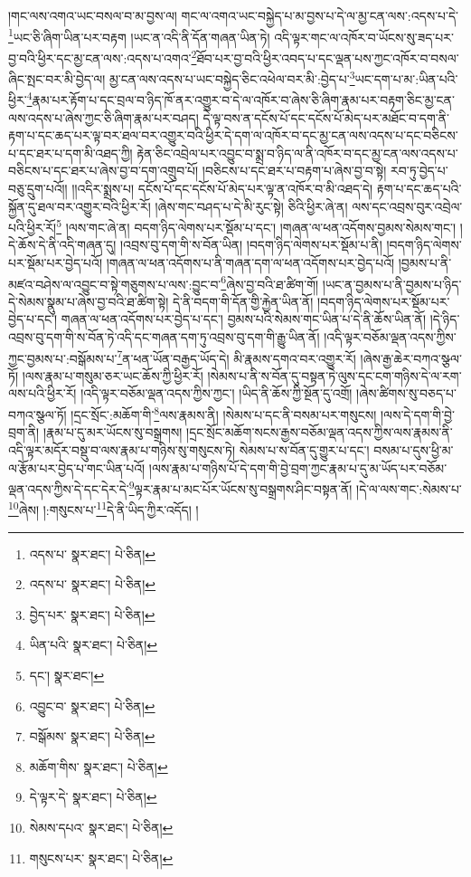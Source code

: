 །གང་ལས་འགའ་ཡང་བསལ་བ་མ་བྱས་ལ། གང་ལ་འགའ་ཡང་བསྐྱེད་པ་མ་བྱས་པ་དེ་ལ་མྱ་ངན་ལས་:འདས་པ་དེ་\footnote{འདས་པ་  སྣར་ཐང་།  པེ་ཅིན། }ཡང་ཅི་ཞིག་ཡིན་པར་བརྟག །ཡང་ན་འདི་ནི་དོན་གཞན་ཡིན་ཏེ། འདི་ལྟར་གང་ལ་འཁོར་བ་ཡོངས་སུ་ཟད་པར་བྱ་བའི་ཕྱིར་དང་མྱ་ངན་ལས་:འདས་པ་འགའ་\footnote{འདས་པ་  སྣར་ཐང་།  པེ་ཅིན། }ཐོབ་པར་བྱ་བའི་ཕྱིར་འབད་པ་དང་ལྡན་པས་ཀྱང་འཁོར་བ་བསལ་ཞིང་སྤང་བར་མི་བྱེད་ལ། མྱ་ངན་ལས་འདས་པ་ཡང་བསྐྱེད་ཅིང་འཕེལ་བར་མི་:བྱེད་པ་\footnote{བྱེད་པར་  སྣར་ཐང་།  པེ་ཅིན། }ཡང་དག་པ་མ་:ཡིན་པའི་ཕྱིར་\footnote{ཡིན་པའི་  སྣར་ཐང་།  པེ་ཅིན། }རྣམ་པར་རྟོག་པ་དང་བྲལ་བ་ཉིད་ཁོ་ནར་འགྱུར་བ་དེ་ལ་འཁོར་བ་ཞེས་ཅི་ཞིག་རྣམ་པར་བརྟག་ཅིང་མྱ་ངན་ལས་འདས་པ་ཞེས་ཀྱང་ཅི་ཞིག་རྣམ་པར་བཤད། དེ་ལྟ་བས་ན་དངོས་པོ་དང་དངོས་པོ་མེད་པར་མཐོང་བ་དག་ནི་རྟག་པ་དང་ཆད་པར་ལྟ་བར་ཐལ་བར་འགྱུར་བའི་ཕྱིར་དེ་དག་ལ་འཁོར་བ་དང་མྱ་ངན་ལས་འདས་པ་དང་བཅིངས་པ་དང་ཐར་པ་དག་མི་འཐད་ཀྱི། རྟེན་ཅིང་འབྲེལ་པར་འབྱུང་བ་སྨྲ་བ་ཉིད་ལ་ནི་འཁོར་བ་དང་མྱ་ངན་ལས་འདས་པ་བཅིངས་པ་དང་ཐར་པ་ཞེས་བྱ་བ་དག་འགྲུབ་པོ། །བཅིངས་པ་དང་ཐར་པ་བརྟག་པ་ཞེས་བྱ་བ་སྟེ། རབ་ཏུ་བྱེད་པ་བཅུ་དྲུག་པའོ།། །།འདིར་སྨྲས་པ། དངོས་པོ་དང་དངོས་པོ་མེད་པར་ལྟ་ན་འཁོར་བ་མི་འཐད་དེ། རྟག་པ་དང་ཆད་པའི་སྐྱོན་དུ་ཐལ་བར་འགྱུར་བའི་ཕྱིར་རོ། །ཞེས་གང་བཤད་པ་དེ་མི་རུང་སྟེ། ཅིའི་ཕྱིར་ཞེ་ན། ལས་དང་འབྲས་བུར་འབྲེལ་པའི་ཕྱིར་རོ།\footnote{དང་།  སྣར་ཐང་། } །ལས་གང་ཞེ་ན། བདག་ཉིད་ལེགས་པར་སྡོམ་པ་དང་། །གཞན་ལ་ཕན་འདོགས་བྱམས་སེམས་གང་། །དེ་ཆོས་དེ་ནི་འདི་གཞན་དུ། །འབྲས་བུ་དག་གི་ས་བོན་ཡིན། །བདག་ཉིད་ལེགས་པར་སྡོམ་པ་ནི། །བདག་ཉིད་ལེགས་པར་སྡོམ་པར་བྱེད་པའོ། །གཞན་ལ་ཕན་འདོགས་པ་ནི་གཞན་དག་ལ་ཕན་འདོགས་པར་བྱེད་པའོ། །བྱམས་པ་ནི་མཛའ་བཤེས་ལ་འབྱུང་བ་སྟེ་གཅུགས་པ་ལས་:བྱུང་བ་\footnote{འབྱུང་བ་  སྣར་ཐང་།  པེ་ཅིན། }ཞེས་བྱ་བའི་ཐ་ཚིག་གོ། །ཡང་ན་བྱམས་པ་ནི་བྱམས་པ་ཉིད་དེ་སེམས་སྣུམ་པ་ཞེས་བྱ་བའི་ཐ་ཚིག་སྟེ། དེ་ནི་བདག་གི་དོན་གྱི་རྐྱེན་ཡིན་ནོ། །བདག་ཉིད་ལེགས་པར་སྡོམ་པར་བྱེད་པ་དང་། གཞན་ལ་ཕན་འདོགས་པར་བྱེད་པ་དང་། བྱམས་པའི་སེམས་གང་ཡིན་པ་དེ་ནི་ཆོས་ཡིན་ནོ། །དེ་ཉིད་འབྲས་བུ་དག་གི་ས་བོན་ཏེ་འདི་དང་གཞན་དག་ཏུ་འབྲས་བུ་དག་གི་རྒྱུ་ཡིན་ནོ། །འདི་ལྟར་བཅོམ་ལྡན་འདས་ཀྱིས་ཀྱང་བྱམས་པ་:བསྒོམས་པ་\footnote{བསྒོམས་  སྣར་ཐང་།  པེ་ཅིན། }ན་ཕན་ཡོན་བརྒྱད་ཡོད་དེ། མི་རྣམས་དགའ་བར་འགྱུར་རོ། །ཞེས་རྒྱ་ཆེར་བཀའ་སྩལ་ཏོ། །ལས་རྣམ་པ་གསུམ་ཅར་ཡང་ཆོས་ཀྱི་ཕྱིར་རོ། །སེམས་པ་ནི་ས་བོན་དུ་བསྟན་ཏེ་ལུས་དང་ངག་གཉིས་དེ་ལ་རག་ལས་པའི་ཕྱིར་རོ། །འདི་ལྟར་བཅོམ་ལྡན་འདས་ཀྱིས་ཀྱང་། །ཡིད་ནི་ཆོས་ཀྱི་སྔོན་དུ་འགྲོ། །ཞེས་ཚིགས་སུ་བཅད་པ་བཀའ་སྩལ་ཏོ། །དྲང་སྲོང་:མཆོག་གི་\footnote{མཆོག་གིས་  སྣར་ཐང་།  པེ་ཅིན། }ལས་རྣམས་ནི། །སེམས་པ་དང་ནི་བསམ་པར་གསུངས། །ལས་དེ་དག་གི་བྱེ་བྲག་ནི། །རྣམ་པ་དུ་མར་ཡོངས་སུ་བསྒྲགས། །དྲང་སྲོང་མཆོག་སངས་རྒྱས་བཅོམ་ལྡན་འདས་ཀྱིས་ལས་རྣམས་ནི་འདི་ལྟར་མདོར་བསྡུ་བ་ལས་རྣམ་པ་གཉིས་སུ་གསུངས་ཏེ། སེམས་པ་ས་བོན་དུ་གྱུར་པ་དང་། བསམ་པ་དུས་ཕྱི་མ་ལ་རྩོམ་པར་བྱེད་པ་གང་ཡིན་པའོ། །ལས་རྣམ་པ་གཉིས་པོ་དེ་དག་གི་བྱེ་བྲག་ཀྱང་རྣམ་པ་དུ་མ་ཡོད་པར་བཅོམ་ལྡན་འདས་ཀྱིས་དེ་དང་དེར་དེ་\footnote{དེ་ལྟར་དེ་  སྣར་ཐང་།  པེ་ཅིན། }ལྟར་རྣམ་པ་མང་པོར་ཡོངས་སུ་བསྒྲགས་ཤིང་བསྟན་ནོ། །དེ་ལ་ལས་གང་:སེམས་པ་\footnote{སེམས་དཔའ་  སྣར་ཐང་།  པེ་ཅིན། }ཞེས། །:གསུངས་པ་\footnote{གསུངས་པར་  སྣར་ཐང་།  པེ་ཅིན། }དེ་ནི་ཡིད་ཀྱིར་འདོད། །
